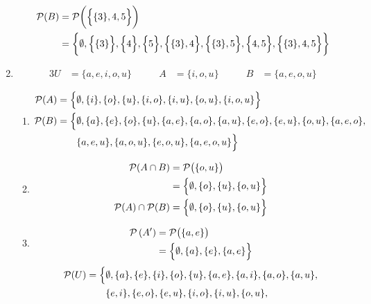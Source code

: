 \documentclass[../notes.tex]{subfiles}
\begin{document}
\begin{enumerate}
\begin{align*}
            \mathcal{P}(B) &= \mathcal{P}\biggl(\Bigl\{\{3\}, 4, 5\Bigr\}\biggr)\\
            &= \biggl\{\emptyset, \Bigl\{\{3\}\Bigr\}, \Bigl\{4\Bigr\}, \Bigl\{5\Bigr\}, \Bigl\{\{3\}, 4\Bigr\}, \Bigl\{\{3\}, 5\Bigr\}, \Bigl\{4, 5\Bigr\}, \Bigl\{\{3\}, 4, 5\Bigr\}\biggr\}
          \end{align*}
        \item 
          \begin{alignat*}{3}
            U &= \{a, e, i, o, u\} \qquad & A &= \{i, o, u\} \qquad & B &= \{a, e, o, u\}
          \end{alignat*}
          \begin{enumerate}[label=(\alph*)]
            \item
              \begin{align*}
                \mathcal{P}(A) &= \Bigl\{\emptyset, \{i\}, \{o\}, \{u\}, \{i, o\}, \{i, u\}, \{o, u\}, \{i, o, u\}\Bigr\}\\
                \mathcal{P}(B) &= \Bigl\{\emptyset, \{a\}, \{e\}, \{o\}, \{u\}, \{a, e\}, \{a, o\}, \{a, u\}, \{e, o\}, \{e, u\}, \{o, u\}, \{a, e, o\},\\
                & \qquad \{a, e, u\}, \{a, o, u\}, \{e, o, u\}, \{a, e, o, u\}\Bigr\}
              \end{align*}
            \item
              \begin{align*}
                \mathcal{P}(A \cap B) &= \mathcal{P}\bigl(\{o, u\}\bigr)\\
                &= \Bigl\{\emptyset, \{o\}, \{u\}, \{o, u\}\Bigr\}\\
                \mathcal{P}(A) \cap \mathcal{P}(B) &= \Bigl\{\emptyset, \{o\}, \{u\}, \{o, u\}\Bigr\}
              \end{align*}
            \item
              \begin{align*}
                \mathcal{P}\left(A'\right) &= \mathcal{P}\bigl(\{a, e\}\bigr)\\
                &= \Bigl\{\emptyset, \{a\}, \{e\}, \{a, e\}\Bigr\}
              \end{align*}
              \begin{align*}
                \mathcal{P}(U) &= \Bigl\{\emptyset, \{a\}, \{e\}, \{i\}, \{o\}, \{u\}, \{a, e\}, \{a, i\}, \{a, o\}, \{a, u\},\\
                & \qquad \{e, i\}, \{e, o\}, \{e, u\}, \{i, o\}, \{i, u\}, \{o, u\},\\

\end{align*}
\end{enumerate}
\end{enumerate}
\end{document}
